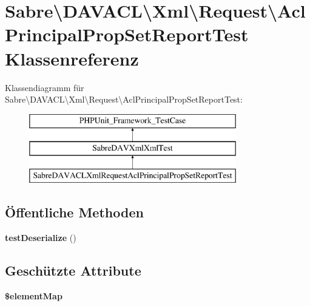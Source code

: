 \hypertarget{class_sabre_1_1_d_a_v_a_c_l_1_1_xml_1_1_request_1_1_acl_principal_prop_set_report_test}{}\section{Sabre\textbackslash{}D\+A\+V\+A\+CL\textbackslash{}Xml\textbackslash{}Request\textbackslash{}Acl\+Principal\+Prop\+Set\+Report\+Test Klassenreferenz}
\label{class_sabre_1_1_d_a_v_a_c_l_1_1_xml_1_1_request_1_1_acl_principal_prop_set_report_test}
Klassendiagramm für Sabre\textbackslash{}D\+A\+V\+A\+CL\textbackslash{}Xml\textbackslash{}Request\textbackslash{}Acl\+Principal\+Prop\+Set\+Report\+Test\+:\begin{figure}[H]
\begin{center}
\leavevmode
\includegraphics[height=3.000000cm]{class_sabre_1_1_d_a_v_a_c_l_1_1_xml_1_1_request_1_1_acl_principal_prop_set_report_test}
\end{center}
\end{figure}
\subsection*{Öffentliche Methoden}
\begin{DoxyCompactItemize}
\item 
\mbox{\label{class_sabre_1_1_d_a_v_a_c_l_1_1_xml_1_1_request_1_1_acl_principal_prop_set_report_test_a8015cc3589c6612fcfeae2923f8d75fd}} 
{\bfseries test\+Deserialize} ()
\end{DoxyCompactItemize}
\subsection*{Geschützte Attribute}
\begin{DoxyCompactItemize}
\item 
{\bfseries \$element\+Map}
\end{DoxyCompactItemize}


